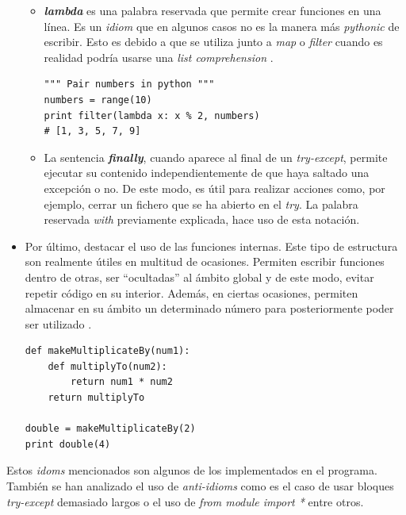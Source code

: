 \documentclass[a4paper, 12pt]{book}
\begin{document}
\begin{itemize}
\begin{itemize}
\item \textbf{\textit{lambda}} es una palabra reservada que permite crear funciones en una línea. Es un \textit{idiom} que en algunos casos no es la manera más \textit{pythonic} de escribir. Esto es debido a que se utiliza junto a \textit{map} o \textit{filter} cuando es realidad podría usarse una \textit{list comprehension} \cite{lambda}.

\begin{verbatim}
""" Pair numbers in python """
numbers = range(10)
print filter(lambda x: x % 2, numbers)
# [1, 3, 5, 7, 9]
\end{verbatim}

\item La sentencia \textbf{\textit{finally}}, cuando aparece al final de un \textit{try-except}, permite ejecutar su contenido independientemente de que haya saltado una excepción o no. De este modo, es útil para realizar acciones como, por ejemplo, cerrar un fichero que se ha abierto en el \textit{try}. La palabra reservada \textit{with} previamente explicada, hace uso de esta notación.

\end{itemize}

\item Por último, destacar el uso de las funciones internas. Este tipo de estructura son realmente útiles en multitud de ocasiones. Permiten escribir funciones dentro de otras, ser ``ocultadas'' al ámbito global y de este modo, evitar repetir código en su interior. Además, en ciertas ocasiones, permiten almacenar en su ámbito un determinado número para posteriormente poder ser utilizado \cite{pep227}. 

\begin{verbatim}
def makeMultiplicateBy(num1):
    def multiplyTo(num2):
        return num1 * num2
    return multiplyTo

double = makeMultiplicateBy(2)
print double(4)
\end{verbatim}

\end{itemize}


Estos \textit{idoms} mencionados son algunos de los implementados en el programa. También se han analizado el uso de \textit{anti-idioms} como es el caso de usar bloques \textit{try-except} demasiado largos o el uso de \textit{from module import *} entre otros.


\end{document}
